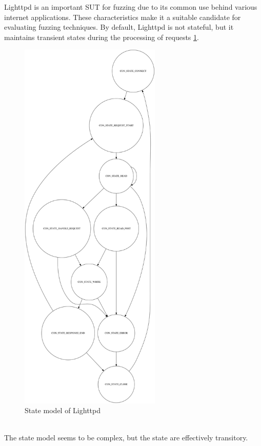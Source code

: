 Lighttpd is an important SUT for fuzzing due to its common use behind various internet applications.
These characteristics make it a suitable candidate for evaluating fuzzing techniques.
By default, Lighttpd is not stateful, but it maintains transient states during the processing of requests \ref{fig:lighttpdstatemodel}.
\begin{figure}[H]
    \centering
    \includegraphics[width=0.6\textwidth]{Images/lighttpd_original.png}
    \caption{State model of Lighttpd}
    \label{fig:lighttpdstatemodel}
\end{figure}
\phantom{}\\
The state model seems to be complex, but the state are effectively transitory.
